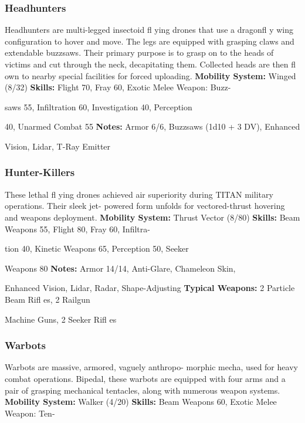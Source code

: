 \subsubsection{Headhunters}

Headhunters are multi-legged insectoid fl ying drones 
that use a dragonfl y wing configuration to hover and 
move. The legs are equipped with grasping claws 
and extendable buzzsaws. Their primary purpose is 
to grasp on to the heads of victims and cut through 
the neck, decapitating them. Collected heads are then 
fl own to nearby special facilities for forced uploading. 
\textbf{Mobility System: }Winged (8/32)
\textbf{Skills:} Flight 70, Fray 60, Exotic Melee Weapon: Buzz-

saws 55, Infiltration 60, Investigation 40, Perception 

40, Unarmed Combat 55
\textbf{Notes:} Armor 6/6, Buzzsaws (1d10 + 3 DV), Enhanced 

Vision, Lidar, T-Ray Emitter

\subsubsection{Hunter-Killers}

These\textbf{  }lethal\textbf{  }fl ying drones achieved air superiority 
during TITAN military operations. Their sleek jet-
powered form unfolds for vectored-thrust hovering 
and weapons deployment.
\textbf{Mobility System: }Thrust Vector (8/80)
\textbf{Skills:} Beam Weapons 55, Flight 80, Fray 60, Infiltra-

tion 40, Kinetic Weapons 65, Perception 50, Seeker 

Weapons 80
\textbf{Notes:} Armor 14/14, Anti-Glare, Chameleon Skin, 

Enhanced Vision, Lidar, Radar, Shape-Adjusting 
\textbf{Typical Weapons:} 2 Particle Beam Rifl es, 2 Railgun 

Machine Guns, 2 Seeker Rifl es

\subsubsection{Warbots}

Warbots are massive, armored, vaguely anthropo-
morphic mecha, used for heavy combat operations. 
Bipedal, these warbots are equipped with four arms 
and a pair of grasping mechanical tentacles, along 
with numerous weapon systems.
\textbf{Mobility System: }Walker (4/20)
\textbf{Skills:} Beam Weapons 60, Exotic Melee Weapon: Ten-

